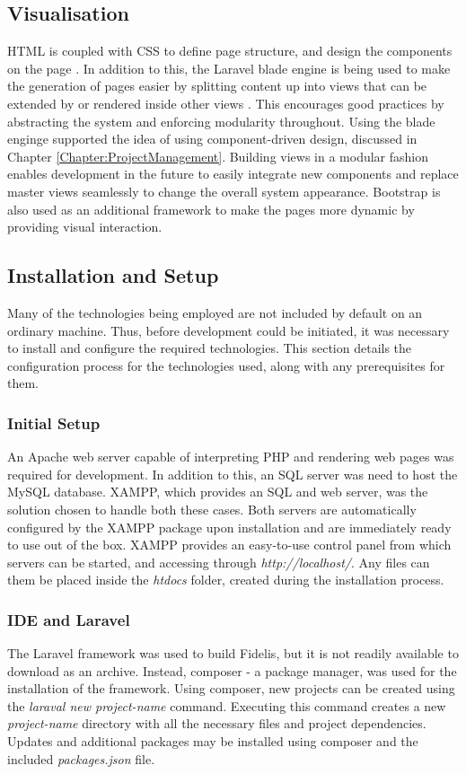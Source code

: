 \subsection{Visualisation}
HTML is coupled with CSS to define page structure, and design the components on the page \cite{W3:HTML5, W3:CSS}. In addition to this, the Laravel blade engine is being used to make the generation of pages easier by splitting content up into views that can be extended by or rendered inside other views \cite{Laravel:Blade}. This encourages good practices by abstracting the system and enforcing modularity throughout. Using the blade enginge supported the idea of using component-driven design, discussed in Chapter \ref{Chapter:ProjectManagement}. Building views in a modular fashion enables development in the future to easily integrate new components and replace master views seamlessly to change the overall system appearance. Bootstrap is also used as an additional framework to make the pages more dynamic by providing visual interaction.

\subsection{Installation and Setup}
Many of the technologies being employed are not included by default on an ordinary machine. Thus, before development could be initiated, it was necessary to install and configure the required technologies. This section details the configuration process for the technologies used, along with any prerequisites for them.

\subsubsection{Initial Setup}
An Apache web server capable of interpreting PHP and rendering web pages was required for development. In addition to this, an SQL server was need to host the MySQL database. XAMPP, which provides an SQL and web server, was the solution chosen to handle both these cases. Both servers are automatically configured by the XAMPP package upon installation and are immediately ready to use out of the box. XAMPP provides an easy-to-use control panel from which servers can be started, and accessing through \textit{http://localhost/}. Any files can them be placed inside the \textit{htdocs} folder, created during the installation process.

\subsubsection{IDE and Laravel}
The Laravel framework was used to build Fidelis, but it is not readily available to download as an archive. Instead, composer - a package manager, was used for the installation of the framework. Using composer, new projects can be created using the \textit{laraval new project-name} command. Executing this command creates a new \textit{project-name} directory with all the necessary files and project dependencies. Updates and additional packages may be installed using composer and the included \textit{packages.json} file.

